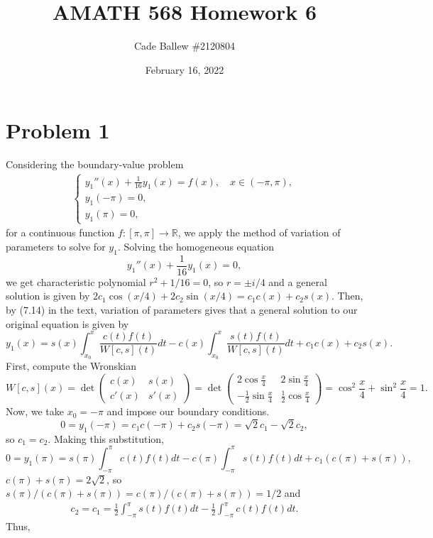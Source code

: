 \documentclass{article}
\title{AMATH 568 Homework 6}
\author{Cade Ballew \#2120804}
\date{February 16, 2022}
\begin{document}
	
\maketitle
	
\section{Problem 1}
Considering the boundary-value problem
  \begin{align*}
    \begin{cases} y_1''(x) + \frac{1}{16} y_1(x) = f(x), \quad x \in (-\pi,\pi),\\
      y_1(-\pi) = 0,\\
      y_1(\pi) = 0, \end{cases}
  \end{align*}
for a continuous function $f: [\pi,\pi] \to \mathbb R$, we apply the method of variation of parameters to solve for $y_1$. Solving the homogeneous equation
\[
y_1''(x) + \frac{1}{16} y_1(x) = 0,
\]
we get characteristic polynomial $r^2+1/16=0$, so $r=\pm i/4$ and a general solution is given by $2c_1\cos(x/4)+2c_2\sin(x/4)=c_1c(x)+c_2s(x)$. Then, by (7.14) in the text, variation of parameters gives that a general solution to our original equation is given by
\[
y_1(x)=s(x)\int_{x_0}^x\frac{c(t)f(t)}{W[c,s](t)}dt-c(x)\int_{x_0}^x\frac{s(t)f(t)}{W[c,s](t)}dt+c_1c(x)+c_2s(x).
\]
First, compute the Wronskian
\[
W[c,s](x)=\det\begin{pmatrix}c(x) &s(x)\\c'(x)&s'(x)\end{pmatrix}=\det\begin{pmatrix}2\cos{\frac{x}{4}} &2\sin{\frac{x}{4}}\\-\frac{1}{2}\sin{\frac{x}{4}}&\frac{1}{2}\cos{\frac{x}{4}}\end{pmatrix}=\cos^2\frac{x}{4}+\sin^2\frac{x}{4}=1.
\]
Now, we take $x_0=-\pi$ and impose our boundary conditions. 
\[
0=y_1(-\pi)=c_1c(-\pi)+c_2s(-\pi)=\sqrt{2}c_1-\sqrt{2}c_2,
\]
so $c_1=c_2$. Making this substitution,
\[
0=y_1(\pi)=s(\pi)\int_{-\pi}^\pi c(t)f(t)dt-c(\pi)\int_{-\pi}^\pi s(t)f(t)dt+c_1(c(\pi)+s(\pi)),
\]
$c(\pi)+s(\pi)=2\sqrt{2}$, so $s(\pi)/(c(\pi)+s(\pi))=c(\pi)/(c(\pi)+s(\pi))=1/2$ and
\begin{align*}
c_2=c_1=\frac{1}{2}\int_{-\pi}^\pi s(t)f(t)dt-\frac{1}{2}\int_{-\pi}^\pi c(t)f(t)dt.
\end{align*}
Thus,
\end{document}
